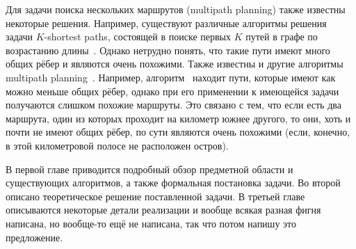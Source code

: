 Для задачи поиска нескольких маршрутов (multipath planning) также
известны некоторые решения. Например, существуют различные алгоритмы
решения задачи $K$-shortest paths, состоящей в поиске первых $K$ путей
в графе по возрастанию длины~\cite{eppstein1998finding,
yen1971finding}. Однако нетрудно понять, что такие пути имеют много
общих рёбер и являются очень похожими. Также известны и другие
алгоритмы multipath planning~\cite{lim2005shortest,
dial1971probabilistic, mafast}. Например,
алгоритм~\cite{lim2005shortest} находит пути, которые имеют как можно
меньше общих рёбер, однако при его применении к имеющейся задачи
получаются слишком похожие маршруты. Это связано с тем, что если есть
два маршрута, один из которых проходит на километр южнее другого, то
они, хоть и почти не имеют общих рёбер, по сути являются очень
похожими (если, конечно, в этой километровой полосе не расположен
остров).


В первой главе приводится подробный обзор предметной области и
существующих алгоритмов, а также формальная постановка задачи. Во
второй описано теоретическое решение поставленной задачи. В третьей
главе описываются некоторые детали реализации и вообще всякая разная
фигня написана, но вообще-то ещё не написана, так что потом напишу это
предложение.

\FloatBarrier


